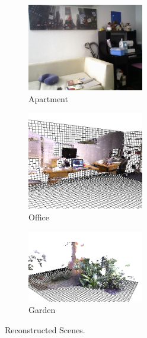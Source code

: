 
\begin{figure}[t] 
        \centering
        \begin{subfigure}[b]{2.0in}
                \includegraphics[width=2.0in]{images/experiments/test_data/Apartment.Texture.rotate.0}
                \caption{Apartment}
                \label{fig:RECON_UNIT}
        \end{subfigure}%
        \begin{subfigure}[b]{2.0in}
                \includegraphics[width=2.0in]{images/ch2/officeA}
                \caption{Office}
                \label{fig:RECON_OFFICE}
        \end{subfigure}%
        \begin{subfigure}[b]{2.0in}
                \includegraphics[width=2.0in]{images/ch2/outdoorA}
                \caption{Garden}
                \label{fig:RECON_GARDEN}
        \end{subfigure}
       \caption{Reconstructed Scenes.}
       \label{fig:RECONSTRUCTIONS}
\end{figure}